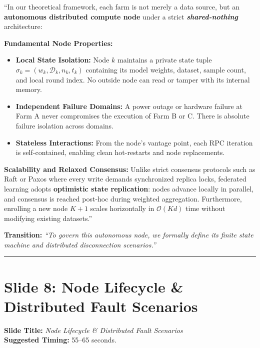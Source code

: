 \documentclass[11pt,a4paper]{article}
\begin{document}
\begin{tcolorbox}[colframe=darkgreen, title=\textbf{What to Say in the Presentation (Literal Script)}]
``In our theoretical framework, each farm is not merely a data source, but an \textbf{autonomous distributed compute node} under a strict \textbf{\textit{shared-nothing}} architecture:

\textbf{Fundamental Node Properties:}
\begin{itemize}
    \item \textbf{Local State Isolation:} Node $k$ maintains a private state tuple $\sigma_k = (w_k, \mathcal{D}_k, n_k, t_k)$ containing its model weights, dataset, sample count, and local round index. No outside node can read or tamper with its internal memory.
    \item \textbf{Independent Failure Domains:} A power outage or hardware failure at Farm A never compromises the execution of Farm B or C. There is absolute failure isolation across domains.
    \item \textbf{Stateless Interactions:} From the node's vantage point, each RPC iteration is self-contained, enabling clean hot-restarts and node replacements.
\end{itemize}

\textbf{Scalability and Relaxed Consensus:}
Unlike strict consensus protocols such as Raft or Paxos where every write demands synchronized replica locks, federated learning adopts \textbf{optimistic state replication}: nodes advance locally in parallel, and consensus is reached post-hoc during weighted aggregation. Furthermore, enrolling a new node $K+1$ scales horizontally in $\mathcal{O}(Kd)$ time without modifying existing datasets.''
\end{tcolorbox}

\textbf{Transition:} \textit{``To govern this autonomous node, we formally define its finite state machine and distributed disconnection scenarios.''}

\vspace{0.35cm}\hrule\vspace{0.35cm}

\section{Slide 8: Node Lifecycle \& Distributed Fault Scenarios}
\textbf{Slide Title:} \textit{Node Lifecycle \& Distributed Fault Scenarios} \\
\textbf{Suggested Timing:} 55--65 seconds.
\end{document}
